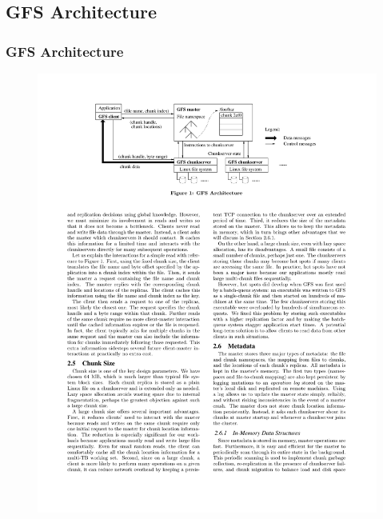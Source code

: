 \documentclass{beamer}
\begin{document}
\subsection{GFS Architecture}
\begin{frame}
\frametitle{GFS Architecture}
\begin{figure}[h]
	\centering
	\includegraphics[width=\linewidth]{figs/GFSArchitecture.pdf}
\end{figure}
%
%
%
\end{frame}
\end{document}
